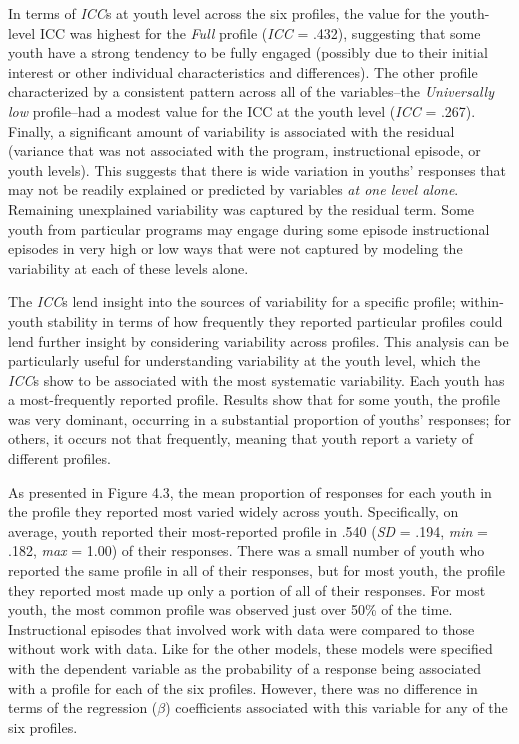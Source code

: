 \documentclass[]{msu-thesis}
\theoremstyle{definition}
\theoremstyle{definition}
\theoremstyle{definition}
\theoremstyle{remark}
\begin{document}
In terms of \emph{ICC}s at youth level across the six profiles, the
value for the youth-level ICC was highest for the \emph{Full} profile
(\emph{ICC} = .432), suggesting that some youth have a strong tendency
to be fully engaged (possibly due to their initial interest or other
individual characteristics and differences). The other profile
characterized by a consistent pattern across all of the variables--the
\emph{Universally low} profile--had a modest value for the ICC at the
youth level (\emph{ICC} = .267). Finally, a significant amount of
variability is associated with the residual (variance that was not
associated with the program, instructional episode, or youth levels).
This suggests that there is wide variation in youths' responses that may
not be readily explained or predicted by variables \emph{at one level
alone}. Remaining unexplained variability was captured by the residual
term. Some youth from particular programs may engage during some episode
instructional episodes in very high or low ways that were not captured
by modeling the variability at each of these levels alone.

The \emph{ICC}s lend insight into the sources of variability for a
specific profile; within-youth stability in terms of how frequently they
reported particular profiles could lend further insight by considering
variability across profiles. This analysis can be particularly useful
for understanding variability at the youth level, which the \emph{ICC}s
show to be associated with the most systematic variability. Each youth
has a most-frequently reported profile. Results show that for some
youth, the profile was very dominant, occurring in a substantial
proportion of youths' responses; for others, it occurs not that
frequently, meaning that youth report a variety of different profiles.

As presented in Figure 4.3, the mean proportion of responses for each
youth in the profile they reported most varied widely across youth.
Specifically, on average, youth reported their most-reported profile in
.540 (\emph{SD} = .194, \emph{min} = .182, \emph{max} = 1.00) of their
responses. There was a small number of youth who reported the same
profile in all of their responses, but for most youth, the profile they
reported most made up only a portion of all of their responses. For most
youth, the most common profile was observed just over 50\% of the time.
Instructional episodes that involved work with data were compared to
those without work with data. Like for the other models, these models
were specified with the dependent variable as the probability of a
response being associated with a profile for each of the six profiles.
However, there was no difference in terms of the regression (\(\beta\))
coefficients associated with this variable for any of the six profiles.
\end{document}
